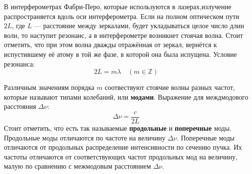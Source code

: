 \documentclass[12pt]{article}
\begin{document}
\par
	В интерферометрах Фабри-Перо, которые используются в лазерах,излучение распространяется вдоль оси интерферометра. Если на полном оптическом пути $2L$, где $L$ ---  расстояние между зеркалами, будет укладываться целое число длин волн, то наступит резонанс, а в интерферометре возникнет стоячая волна. Стоит отметить, что при этом волна дважды отражённая от зеркал, вернётся к испустившему её атому в той же фазе, в которой она была испущена. Условие резонанса:
\begin{equation}
	2L = m \lambda \quad (m \in \mathbb{Z}) \label{res}
\end{equation}
\par
	Различным значениям порядка $m$ соотвествуют стоячие волны разных частот, которые называют типами колебаний, или {\bf модами}. Выражение для междмодового расстояния $\Delta \nu$:
\begin{equation}
	\Delta \nu = \frac{c}{2L} \label{NU}
\end{equation}
	Стоит отметить, что есть так называемые {\bf продольные} и {\bf поперечные} моды. Продольные моды отличаются по частоте на величину $\Delta \nu$. Поперечные моды отличаются от продольных распределение интенсивности по сечению пучка. Их частоты отличаются от соответствующих частот продольных мод на величину, малую по сравнению с межмодовым расстоянием $\Delta \nu$.
\end{document}
